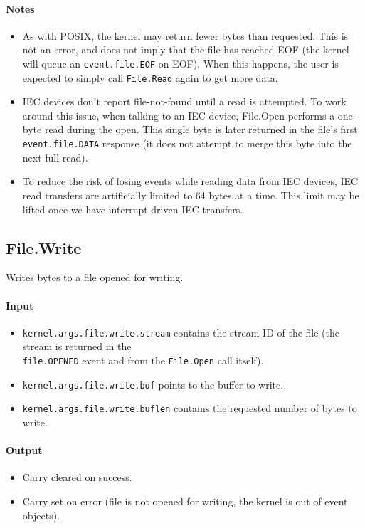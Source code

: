 \paragraph{Notes}
\begin{itemize}
\item As with POSIX, the kernel may return fewer bytes than requested.  This is not an error, and does not imply that the file has reached EOF (the kernel will queue an \verb+event.file.EOF+ on EOF).  When this happens, the user is expected to simply call \verb+File.Read+ again to get more data.

\item IEC devices don't report file-not-found until a read is attempted.  To work around this issue, when talking to an IEC device, File.Open performs a one-byte read during the open.  This single byte is later returned in the file's first \verb+event.file.DATA+ response (it does not attempt to merge this byte into the next full read).  

\item To reduce the risk of losing events while reading data from IEC devices, IEC read transfers are artificially limited to 64 bytes at a time.  This limit may be lifted once we have interrupt driven IEC transfers.
\end{itemize}

\subsection*{File.Write}
Writes bytes to a file opened for writing.

\paragraph{Input}
\begin{itemize}
\item \verb+kernel.args.file.write.stream+ contains the stream ID of the file (the stream is returned in the \\ \verb+file.OPENED+ event and from the \verb+File.Open+ call itself).
\item \verb+kernel.args.file.write.buf+ points to the buffer to write.
\item \verb+kernel.args.file.write.buflen+ contains the requested number of bytes to write.
\end{itemize}

\paragraph{Output}
\begin{itemize}
\item Carry cleared on success.
\item Carry set on error (file is not opened for writing, the kernel is out of event objects).
\end{itemize}

